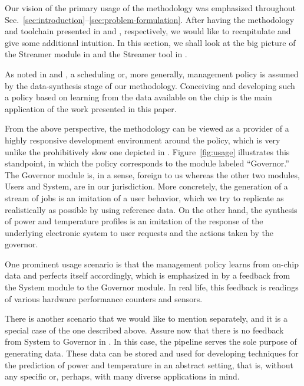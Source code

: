 
Our vision of the primary usage of the methodology was emphasized throughout
Sec.~\ref{sec:introduction}--\ref{sec:problem-formulation}. After having the
methodology and toolchain presented in  and ,
respectively, we would like to recapitulate and give some additional intuition.
In this section, we shall look at the big picture of the Streamer module in
 and the Streamer tool in .

As noted in  and , a scheduling or, more
generally, management policy is assumed by the data-synthesis stage of our
methodology. Conceiving and developing such a policy based on learning from the
data available on the chip is the main application of the work presented in this
paper.

From the above perspective, the methodology can be viewed as a provider of a
highly responsive development environment around the policy, which is very
unlike the prohibitively slow one depicted in .
Figure~\ref{fig:usage} illustrates this standpoint, in which the policy
corresponds to the module labeled ``Governor.'' The Governor module is, in a
sense, foreign to us whereas the other two modules, Users and System, are in our
jurisdiction. More concretely, the generation of a stream of jobs is an
imitation of a user behavior, which we try to replicate as realistically as
possible by using reference data. On the other hand, the synthesis of power and
temperature profiles is an imitation of the response of the underlying
electronic system to user requests and the actions taken by the governor.

One prominent usage scenario is that the management policy learns from on-chip
data and perfects itself accordingly, which is emphasized in  by a
feedback from the System module to the Governor module. In real life, this
feedback is readings of various hardware performance counters and sensors.

There is another scenario that we would like to mention separately, and it is a
special case of the one described above. Assure now that there is no feedback
from System to Governor in . In this case, the pipeline serves the
sole purpose of generating data. These data can be stored and used for
developing techniques for the prediction of power and temperature in an abstract
setting, that is, without any specific or, perhaps, with many diverse
applications in mind.
